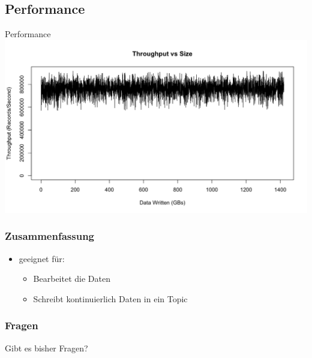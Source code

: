 \subsection{Performance}
\begin{frame}{Performance}
	\centering
	\includegraphics[scale=0.2]{figure/throughput_vs_size_0.png}

	\pnote{}
\end{frame}

\begin{frame}
\frametitle{Zusammenfassung}



\begin{itemize}
	\item geeignet für:
	\begin{itemize}
		\item Bearbeitet die Daten %
		\item Schreibt kontinuierlich Daten in ein Topic %
	\end{itemize}
\end{itemize}

\end{frame}

\begin{frame}
\frametitle{Fragen}
\begin{center}
\Large{Gibt es bisher Fragen?}
\end{center}
\end{frame}